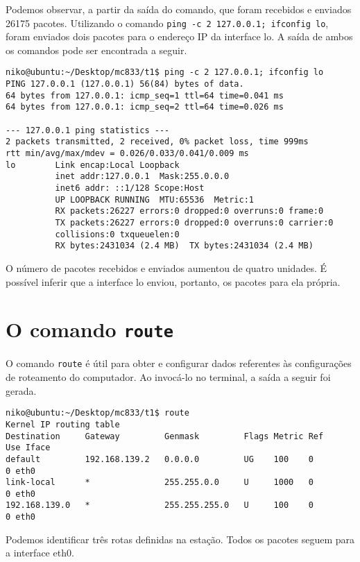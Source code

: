 \documentclass[a4paper,10pt]{article}
\begin{document}
Podemos observar, a partir da saída do comando, que foram recebidos e enviados 26175 pacotes. Utilizando o comando {\tt ping -c 2 127.0.0.1; ifconfig lo}, foram enviados dois pacotes para o endereço IP da interface lo. A saída de ambos os comandos pode ser encontrada a seguir.

\begin{lstlisting}
niko@ubuntu:~/Desktop/mc833/t1$ ping -c 2 127.0.0.1; ifconfig lo
PING 127.0.0.1 (127.0.0.1) 56(84) bytes of data.
64 bytes from 127.0.0.1: icmp_seq=1 ttl=64 time=0.041 ms
64 bytes from 127.0.0.1: icmp_seq=2 ttl=64 time=0.026 ms

--- 127.0.0.1 ping statistics ---
2 packets transmitted, 2 received, 0% packet loss, time 999ms
rtt min/avg/max/mdev = 0.026/0.033/0.041/0.009 ms
lo        Link encap:Local Loopback  
          inet addr:127.0.0.1  Mask:255.0.0.0
          inet6 addr: ::1/128 Scope:Host
          UP LOOPBACK RUNNING  MTU:65536  Metric:1
          RX packets:26227 errors:0 dropped:0 overruns:0 frame:0
          TX packets:26227 errors:0 dropped:0 overruns:0 carrier:0
          collisions:0 txqueuelen:0 
          RX bytes:2431034 (2.4 MB)  TX bytes:2431034 (2.4 MB)
\end{lstlisting}

O número de pacotes recebidos e enviados aumentou de quatro unidades. É possível inferir que a interface lo enviou, portanto, os pacotes para ela própria.

\section{O comando {\tt route}}

O comando {\tt route} é útil para obter e configurar dados referentes às configurações de roteamento do computador. Ao invocá-lo no terminal, a saída a seguir foi gerada.

\begin{lstlisting}
niko@ubuntu:~/Desktop/mc833/t1$ route
Kernel IP routing table
Destination     Gateway         Genmask         Flags Metric Ref    Use Iface
default         192.168.139.2   0.0.0.0         UG    100    0        0 eth0
link-local      *               255.255.0.0     U     1000   0        0 eth0
192.168.139.0   *               255.255.255.0   U     100    0        0 eth0

\end{lstlisting}

Podemos identificar três rotas definidas na estação. Todos os pacotes seguem para a interface eth0.
\end{document}
